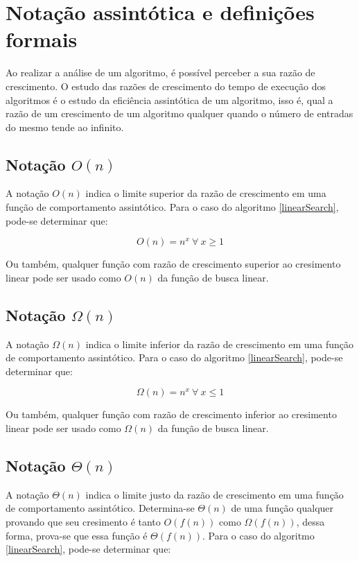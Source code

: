 \section{Notação assintótica e definições formais}

Ao realizar a análise de um algoritmo, é possível perceber a sua razão de crescimento. O estudo das razões de
crescimento do tempo de execução dos algoritmos é o estudo da eficiência assintótica de um algoritmo, isso é,
qual a razão de um crescimento de um algoritmo qualquer quando o número de entradas do mesmo tende ao infinito.

\subsection{Notação $O(n)$}

A notação $O(n)$ indica o limite superior da razão de crescimento em uma função de comportamento assintótico.
Para o caso do algoritmo \ref{linearSearch}, pode-se determinar que:

\begin{equation*} 
    O(n) = n^x \:  \forall \:  x \geq 1
\end{equation*}

Ou também, qualquer função com razão de crescimento superior ao cresimento linear pode ser usado como $O(n)$ da
função de busca linear.

\subsection{Notação $\Omega(n)$}

A notação $\Omega(n)$ indica o limite inferior da razão de crescimento em uma função de comportamento assintótico.
Para o caso do algoritmo \ref{linearSearch}, pode-se determinar que:

\begin{equation*} 
    \Omega(n) = n^x \:  \forall \:  x \leq 1
\end{equation*}

Ou também, qualquer função com razão de crescimento inferior ao cresimento linear pode ser usado como $\Omega(n)$ da
função de busca linear.

\subsection{Notação $\Theta(n)$}

A notação $\Theta(n)$ indica o limite justo da razão de crescimento em uma função de comportamento assintótico.
Determina-se $\Theta(n)$ de uma função qualquer provando que seu cresimento é tanto $O(f(n))$ como
$\Omega(f(n))$, dessa forma, prova-se que essa função é $\Theta(f(n))$.
Para o caso do algoritmo \ref{linearSearch}, pode-se determinar que:

